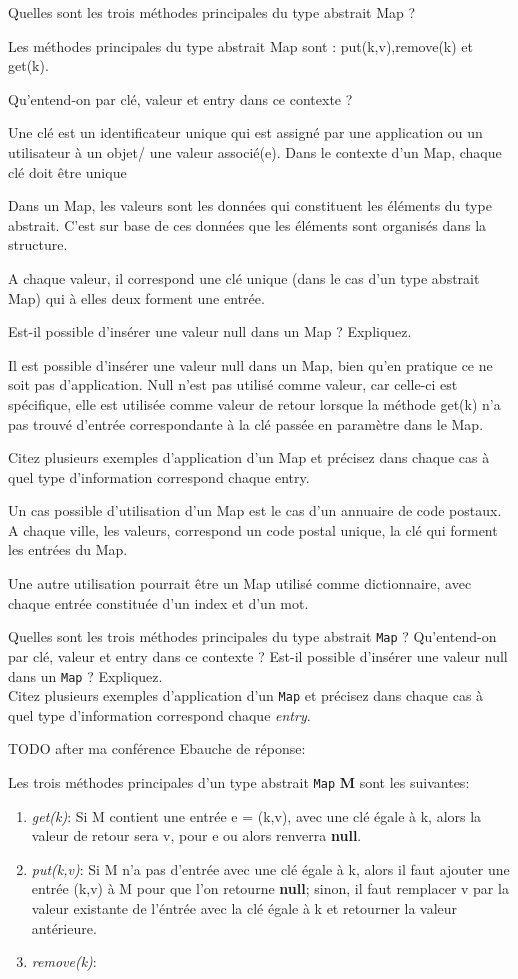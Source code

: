 Quelles sont les trois méthodes principales du type abstrait Map ?

Les méthodes principales du type abstrait Map sont : put(k,v),remove(k) et get(k).

Qu’entend-on par clé, valeur et entry dans ce contexte ?

Une clé est un identificateur unique qui est assigné par une application ou un utilisateur à un objet/ une valeur associé(e). Dans le contexte d'un Map, chaque clé doit être unique

Dans un Map, les valeurs sont les données qui constituent les éléments du type abstrait. C'est sur base de ces données que les éléments sont organisés dans la structure.

A chaque valeur, il correspond une clé unique (dans le cas d'un type abstrait Map) qui à elles deux forment une entrée.

Est-il possible d’insérer une valeur null dans un Map ? Expliquez.

Il est possible d'insérer une valeur null dans un Map, bien qu'en pratique ce ne soit pas d'application. Null n'est pas utilisé comme valeur, car celle-ci est spécifique, elle est utilisée comme valeur de retour lorsque la méthode get(k) n'a pas trouvé d'entrée correspondante à la clé passée en paramètre dans le Map.

Citez plusieurs exemples d’application d’un Map et précisez dans chaque cas à quel type d’information correspond chaque entry.

Un cas possible d'utilisation d'un Map est le cas d'un annuaire de code postaux. A chaque ville, les valeurs, correspond un code postal unique, la clé qui forment les entrées du Map.

Une autre utilisation pourrait être un Map utilisé comme dictionnaire, avec chaque entrée constituée d'un index et d'un mot.

Quelles sont les trois méthodes principales du type abstrait \texttt{Map} ? Qu’entend-on par clé,
valeur et entry dans ce contexte ? Est-il possible d’insérer une valeur null dans un \texttt{Map} ? Expliquez. \\
Citez plusieurs exemples d’application d’un \texttt{Map} et précisez dans chaque cas à quel type d’information 
correspond chaque \textit{entry}.

TODO after ma conférence 
Ebauche de réponse:

Les trois méthodes principales d'un type abstrait \texttt{Map} \textbf{M} sont les suivantes:
\begin{enumerate}
\item \textit{get(k)}: Si M contient une entrée e = (k,v), avec une clé égale à k, alors la valeur de retour sera v, pour e 
ou alors renverra \textbf{null}.
\item \textit{put(k,v)}: Si M n'a pas d'entrée avec une clé égale à k, alors il faut ajouter une entrée (k,v) à M pour 
que l'on retourne \textbf{null}; sinon, il faut remplacer v par la valeur existante de l'éntrée avec la clé égale à k et retourner 
la valeur antérieure.
\item \textit{remove(k)}:
\end{enumerate}

